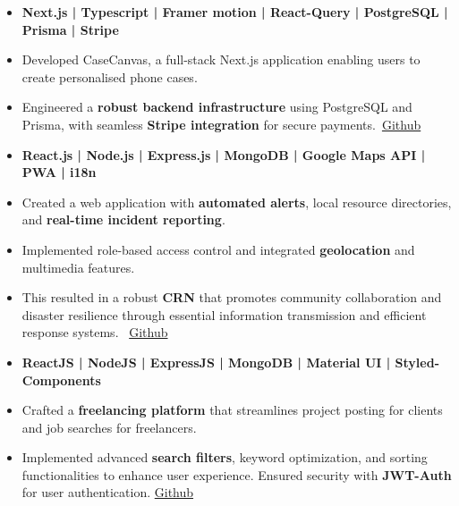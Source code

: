 \begin{itemize}
\item \textbf{Next.js | Typescript | Framer motion | React-Query | PostgreSQL | Prisma | Stripe} 
\item Developed CaseCanvas, a full-stack Next.js application enabling users to create personalised phone cases.
\item Engineered a \textbf{robust backend infrastructure} using PostgreSQL and Prisma, with seamless \textbf{Stripe integration} for secure payments.\
\href{https://github.com/Bhanu1776/CaseCanvas}{Github}
\end{itemize}
\smallskip
\smallskip
{}
\begin{itemize}
\item \textbf{React.js | Node.js | Express.js | MongoDB | Google Maps API | PWA | i18n} 
\item Created a web application with \textbf{automated alerts}, local resource directories, and \textbf{real-time incident reporting}. 
\item Implemented role-based access control and integrated \textbf{geolocation} and multimedia features.
\item This resulted in a robust \textbf{CRN} that promotes community collaboration and disaster resilience through essential information transmission and efficient response systems. \
\href{https://github.com/Bhanu1776/Community-Resilience-Network}{Github}
\end{itemize}
\smallskip
\smallskip
{}
\begin{itemize}
\item \textbf{ReactJS | NodeJS | ExpressJS | MongoDB | Material UI | Styled-Components}
\item Crafted a \textbf{freelancing platform} that streamlines project posting for clients and job searches for freelancers.
\item Implemented advanced \textbf{search filters}, keyword optimization, and sorting functionalities to enhance user experience. Ensured security with \textbf{JWT-Auth} for user authentication.
\href{https://github.com/Bhanu1776/Freelansters}{Github}
\end{itemize}
\cvproject{}

